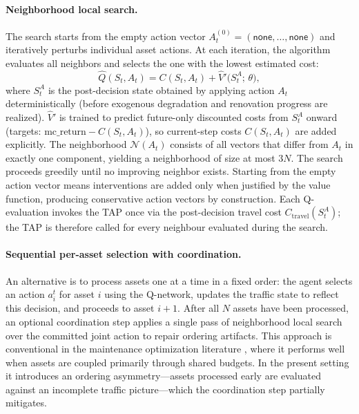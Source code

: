 \documentclass[3p, twocolumn]{elsarticle}
\begin{document}
\paragraph{Neighborhood local search.}
The search starts from the empty action vector $A_t^{(0)} = (\textsf{none}, \ldots, \textsf{none})$ and iteratively perturbs individual asset actions. At each iteration, the algorithm evaluates all neighbors and selects the one with the lowest estimated cost:
\begin{equation}
    \hat{Q}(S_t, A_t) = C(S_t, A_t) + \hat{V}'\!\big(S_t^{A};\,\theta\big),
    \label{eq:approx_Q}
\end{equation}
where $S_t^{A}$ is the post-decision state obtained by applying action $A_t$ deterministically (before exogenous degradation and renovation progress are realized). $\hat{V}'$ is trained to predict future-only discounted costs from $S_t^{A}$ onward (targets: $\text{mc\_return} - C(S_t, A_t)$), so current-step costs $C(S_t, A_t)$ are added explicitly. The neighborhood $\mathcal{N}(A_t)$ consists of all vectors that differ from $A_t$ in exactly one component, yielding a neighborhood of size at most $3N$. The search proceeds greedily until no improving neighbor exists. Starting from the empty action vector means interventions are added only when justified by the value function, producing conservative action vectors by construction. Each Q-evaluation invokes the TAP once via the post-decision travel cost $C_{\text{travel}}(S_t^{A})$; the TAP is therefore called for every neighbour evaluated during the search.

\paragraph{Sequential per-asset selection with coordination.}
An alternative is to process assets one at a time in a fixed order: the agent selects an action $a_i^t$ for asset $i$ using the Q-network, updates the traffic state to reflect this decision, and proceeds to asset $i+1$. After all $N$ assets have been processed, an optional coordination step applies a single pass of neighborhood local search over the committed joint action to repair ordering artifacts. This approach is conventional in the maintenance optimization literature \citep{andriotis_managing_2019, vanremmerdenDeepMultiobjectiveReinforcement2025}, where it performs well when assets are coupled primarily through shared budgets. In the present setting it introduces an ordering asymmetry---assets processed early are evaluated against an incomplete traffic picture---which the coordination step partially mitigates.
\end{document}
